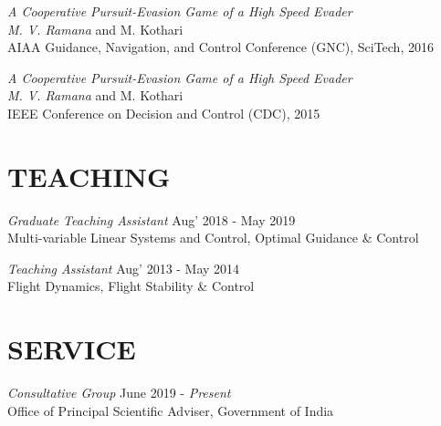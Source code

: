 \documentclass[margin, 10pt]{res} %
\newcommand{\ak}[1]{\textcolor{blue}{#1}}
\begin{document}
\begin{resume}
{\sl A Cooperative Pursuit-Evasion Game of a High Speed Evader} \\
\textit{M. V. Ramana} and M. Kothari \\
AIAA Guidance, Navigation, and Control Conference (GNC), SciTech, 2016

{\sl A Cooperative Pursuit-Evasion Game of a High Speed Evader} \\
\textit{M. V. Ramana} and M. Kothari \\
IEEE Conference on Decision and Control (CDC), 2015




\section{TEACHING}

{\sl Graduate Teaching Assistant} \hfill Aug' 2018 - May 2019\\
Multi-variable Linear Systems and Control, Optimal Guidance \& Control

{\sl Teaching Assistant} \hfill Aug' 2013 - May 2014\\
Flight Dynamics, Flight Stability \& Control


\section{SERVICE}

{\sl Consultative Group} \hfill June 2019 - \emph{Present}\\ 
Office of Principal Scientific Adviser, Government of India


\end{resume}
\end{document}
